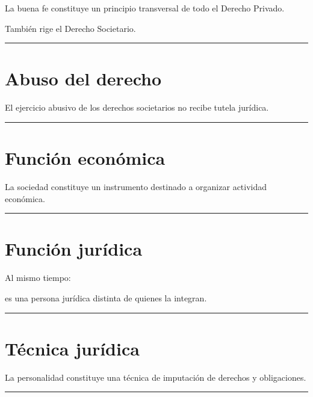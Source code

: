 \documentclass[
  spanish,
  letterpaper,
  DIV=11,
  numbers=noendperiod]{scrartcl}
\begin{document}
La buena fe constituye un principio transversal de todo el Derecho
Privado.

También rige el Derecho Societario.

\begin{center}\rule{0.5\linewidth}{0.5pt}\end{center}

\section{Abuso del derecho}\label{abuso-del-derecho}

El ejercicio abusivo de los derechos societarios no recibe tutela
jurídica.

\begin{center}\rule{0.5\linewidth}{0.5pt}\end{center}

\section{Función económica}\label{funciuxf3n-econuxf3mica}

La sociedad constituye un instrumento destinado a organizar actividad
económica.

\begin{center}\rule{0.5\linewidth}{0.5pt}\end{center}

\section{Función jurídica}\label{funciuxf3n-juruxeddica}

Al mismo tiempo:

es una persona jurídica distinta de quienes la integran.

\begin{center}\rule{0.5\linewidth}{0.5pt}\end{center}

\section{Técnica jurídica}\label{tuxe9cnica-juruxeddica}

La personalidad constituye una técnica de imputación de derechos y
obligaciones.

\begin{center}\rule{0.5\linewidth}{0.5pt}\end{center}
\end{document}
